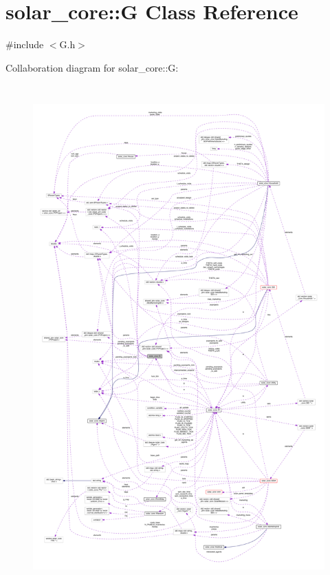 \hypertarget{classsolar__core_1_1_g}{}\section{solar\+\_\+core\+:\+:G Class Reference}
\label{classsolar__core_1_1_g}


{\ttfamily \#include $<$G.\+h$>$}



Collaboration diagram for solar\+\_\+core\+:\+:G\+:
\nopagebreak
\begin{figure}[H]
\begin{center}
\leavevmode
\includegraphics[height=550pt]{classsolar__core_1_1_g__coll__graph}
\end{center}
\end{figure}
